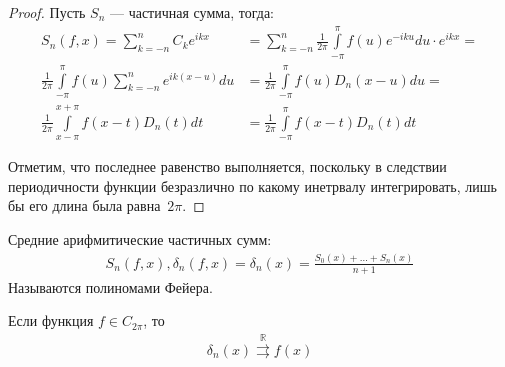 \begin{proof}
  Пусть $S_n$ --- частичная сумма, тогда:
  \begin{align*}
    S_n(f, x) = \sum\limits_{k = -n}^{n} C_k e^{ikx} &= \sum\limits_{k = -n}^{n}
    \frac{1}{2\pi} \int\limits_{-\pi}^\pi f(u) e^{-iku} du \cdot e^{ikx} = \\
    \frac{1}{2\pi} \int\limits_{-\pi}^\pi f(u) \sum\limits_{k = -n}^{n} e^{ik(x
    - u)} du &=  \frac{1}{2\pi} \int\limits_{-\pi}^\pi f(u) D_n(x - u) du = \\
    \frac{1}{2\pi} \int\limits_{x -\pi}^{x + \pi} f(x - t) D_n(t) dt &=
    \frac{1}{2\pi} \int\limits_{-\pi}^\pi f(x - t) D_n(t) dt
  \end{align*}
  \begin{comment}
    Использовалась замена: $x - u = t$.
  \end{comment}
  Отметим, что последнее равенство выполняется, поскольку в следствии
  периодичности функции безразлично по какому инетрвалу интегрировать, лишь бы
  его длина была равна~$2\pi$.
\end{proof}

\begin{definition}
  Средние арифмитические частичных сумм:
  \begin{gather}
    S_n(f, x), \delta_n(f, x) = \delta_n(x) = \frac{S_0(x) + \dots +
    S_n(x)}{n+1}
    \label{def444:eq1}
  \end{gather}
  Называются полиномами Фейера.
\end{definition}

\begin{theorem}
  Если функция $f \in C_{2\pi}$, то
  \begin{gather}
    \delta_n(x) \stackrel{\mathrm{\mathbb{R}}}{\rightrightarrows} f(x)
    \label{th442:fnef1}
  \end{gather}
\end{theorem}

